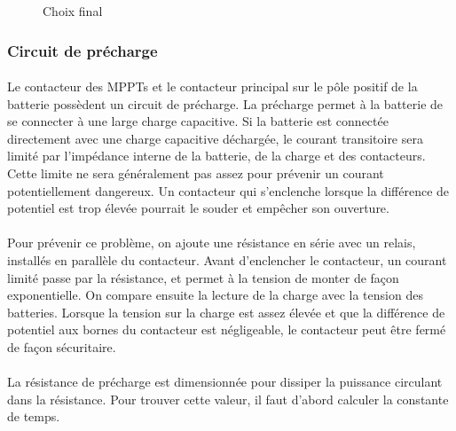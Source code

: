 		\begin{figure}[H]
			\centering
			\caption{Choix final}
			\label{fig:contactorsolfinal}
		\end{figure}

	\newpage

	\subsubsection*{Circuit de précharge}
		\paragraph*{}
		Le contacteur des MPPTs et le contacteur principal sur le pôle positif de la batterie possèdent un circuit de précharge. La précharge permet à la batterie de se connecter à une large charge capacitive. Si la batterie est connectée directement avec une charge capacitive déchargée, le courant transitoire sera limité par l'impédance interne de la batterie, de la charge et des contacteurs. Cette limite ne sera généralement pas assez pour prévenir un courant potentiellement dangereux. Un contacteur qui s'enclenche lorsque la différence de potentiel est trop élevée pourrait le souder et empêcher son ouverture.

		\paragraph*{}
		Pour prévenir ce problème, on ajoute une résistance en série avec un relais, installés en parallèle du contacteur. Avant d'enclencher le contacteur, un courant limité passe par la résistance, et permet à la tension de monter de façon exponentielle. On compare ensuite la lecture de la charge avec la tension des batteries. Lorsque la tension sur la charge est assez élevée et que la différence de potentiel aux bornes du contacteur est négligeable, le contacteur peut être fermé de façon sécuritaire\cite{System_Approach}.

		\paragraph*{}
		La résistance de précharge est dimensionnée pour dissiper la puissance circulant dans la résistance. Pour trouver cette valeur, il faut d'abord calculer la constante de temps\cite{LiIonBms}.

